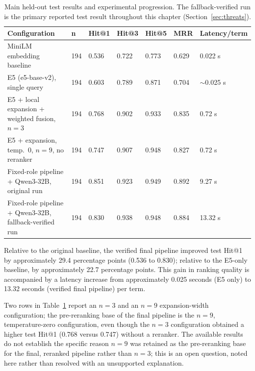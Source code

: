 \begingroup
\footnotesize
\begin{table}[htbp]
\centering
\setlength{\tabcolsep}{4pt}
\begin{tabular}{p{4.4cm}p{0.7cm}p{1.0cm}p{1.0cm}p{1.0cm}p{1.0cm}p{1.6cm}}
\toprule
\textbf{Configuration} & \textbf{n} & \textbf{Hit@1} & \textbf{Hit@3} & \textbf{Hit@5} & \textbf{MRR} & \textbf{Latency/term}\\
\midrule
MiniLM embedding baseline & 194 & 0.536 & 0.722 & 0.773 & 0.629 & 0.022 s\\
E5 (e5-base-v2), single query & 194 & 0.603 & 0.789 & 0.871 & 0.704 & $\sim$0.025 s\\
E5 + local expansion + weighted fusion, $n=3$ & 194 & 0.768 & 0.902 & 0.933 & 0.835 & 0.72 s\\
E5 + expansion, temp.\ 0, $n=9$, no reranker & 194 & 0.747 & 0.907 & 0.948 & 0.827 & 0.72 s\\
Fixed-role pipeline + Qwen3-32B, original run & 194 & 0.851 & 0.923 & 0.949 & 0.892 & 9.27 s\\
Fixed-role pipeline + Qwen3-32B, fallback-verified run & 194 & 0.830 & 0.938 & 0.948 & 0.884 & 13.32 s\\
\bottomrule
\end{tabular}
\caption{Main held-out test results and experimental progression. The fallback-verified run is the primary reported test result throughout this chapter (Section~\ref{sec:threats}).}
\label{tab:test-progression}
\end{table}
\endgroup

Relative to the original baseline, the verified final pipeline improved test Hit@1 by approximately 29.4 percentage points (0.536 to 0.830); relative to the E5-only baseline, by approximately 22.7 percentage points. This gain in ranking quality is accompanied by a latency increase from approximately 0.025 seconds (E5 only) to 13.32 seconds (verified final pipeline) per term.

Two rows in Table~\ref{tab:test-progression} report an $n=3$ and an $n=9$ expansion-width configuration; the pre-reranking base of the final pipeline is the $n=9$, temperature-zero configuration, even though the $n=3$ configuration obtained a higher test Hit@1 (0.768 versus 0.747) without a reranker. The available results do not establish the specific reason $n=9$ was retained as the pre-reranking base for the final, reranked pipeline rather than $n=3$; this is an open question, noted here rather than resolved with an unsupported explanation.

